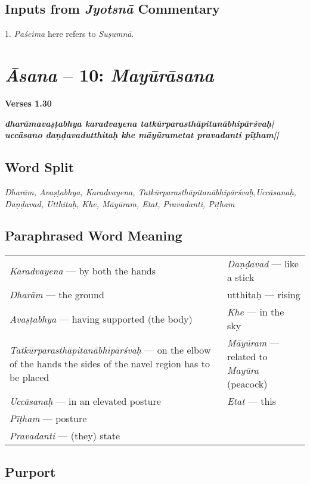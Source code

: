 \subsection*{Inputs from \textit{Jyotsnā} Commentary}
\vspace{-10pt}

1. \textit{Paścima} here refers to \textit{Suṣumnā}.

\section*{\textit{Āsana} -- 10: \textit{Mayūrāsana}}


\noindent 
\textbf{Verses 1.30}

\begin{shloka}
\textit{\textbf{dharāmavaṣṭabhya karadvayena tatkūrparasthāpitanābhipārśvaḥ|}\\
\textbf{uccāsano daṇḍavadutthitaḥ khe māyūrametat pravadanti pīṭham||}}
\end{shloka}

\subsection*{Word Split}

\textit{Dharām, Avaṣṭabhya, Karadvayena, Tatkūrparasthāpitanābhipārśvaḥ,\break Uccāsanaḥ, Daṇḍavad, Utthitaḥ, Khe, Māyūram, Etat, Pravadanti, Pīṭham}

\subsection*{Paraphrased Word Meaning}

\begin{longtable}{>{\noindent\raggedright}p{5cm}>{\noindent\raggedright}p{5cm}}
\textit{Karadvayena} --- by both the hands &  \textit{Daṇḍavad} --- like  a stick\tabularnewline
\textit{Dharām} --- the ground  & utthitaḥ --- rising\tabularnewline
\textit{Avaṣṭabhya} --- having supported (the body) & \textit{Khe} --- in the sky\tabularnewline
\textit{Tatkūrparasthāpitanābhipārśvaḥ} --- on the elbow of the hands the sides of the navel  region has to be placed & \textit{Māyūram} --- related to  \textit{Mayūra} (peacock)\tabularnewline
\textit{Uccāsanaḥ} --- in an elevated posture & \textit{Etat} --- this\tabularnewline
\textit{Pīṭham} --- posture  & \tabularnewline
\textit{Pravadanti} --- (they) state & 
\end{longtable}

\subsection*{Purport}


